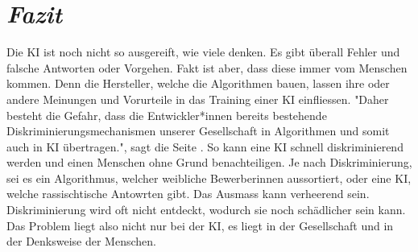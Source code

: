 \documentclass{article}
\begin{document}
\section{\textit{Fazit}}
Die KI ist noch nicht so ausgereift, wie viele denken. Es gibt überall Fehler und falsche Antworten oder Vorgehen. Fakt ist aber, dass diese immer vom Menschen kommen. Denn die Hersteller, welche die Algorithmen bauen, lassen ihre oder andere Meinungen und Vorurteile in das Training einer KI einfliessen. "Daher besteht die Gefahr, dass die Entwickler*innen bereits bestehende Diskriminierungsmechanismen unserer Gesellschaft in Algorithmen und somit auch in KI übertragen.", sagt die Seite \citep{Digitalisierung}. So kann eine KI schnell diskriminierend werden und einen Menschen ohne Grund benachteiligen. Je nach Diskriminierung, sei es ein Algorithmus, welcher weibliche Bewerberinnen aussortiert, oder eine KI, welche rassischtische Antowrten gibt. Das Ausmass kann verheerend sein. Diskriminierung wird oft nicht entdeckt, wodurch sie noch schädlicher sein kann. Das Problem liegt also nicht nur bei der KI, es liegt in der Gesellschaft und in der Denksweise der Menschen. 

\nocite{*}

\printbibliography
\end{document}
